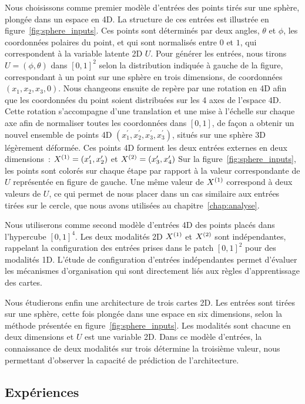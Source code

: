 \documentclass[../main]{subfiles}
\begin{document}
Nous choisissons comme premier modèle d'entrées des points tirés sur une sphère, plongée dans un espace en 4D. 
La structure de ces entrées est illustrée en figure~\ref{fig:sphere_inputs}.
Ces points sont déterminés par deux angles, $\theta$ et $\phi$, les coordonnées polaires du point, et qui sont normalisés entre $0$ et $1$, qui correspondent à la variable latente 2D $U$.
Pour générer les entrées, nous tirons $U = (\phi,\theta)$ dans $[0,1]^2$ selon la distribution indiquée à gauche de la figure, correspondant à un point sur une sphère en trois dimensions, de coordonnées $(x_1,x_2,x_3,0)$. 
Nous changeons ensuite de repère par une rotation en 4D afin que les coordonnées du point soient distribuées sur les 4 axes de l'espace 4D. Cette rotation s'accompagne d'une translation et une mise à l'échelle sur chaque axe afin de normaliser toutes les coordonnées dans $[0,1]$, de façon a obtenir un nouvel ensemble de points 4D $(x_1^\prime,x_2^\prime,x_3^\prime,x_3^\prime)$, situés sur une sphère 3D légèrement déformée.
Ces points 4D forment les deux entrées externes en deux dimensions~: $X^{({1})} = (x_1^\prime, x_2^\prime)$ et $X^{({2})}= (x_3^\prime, x_4^\prime)$
Sur la figure~\ref{fig:sphere_inputs}, les points sont colorés sur chaque étape par rapport à la valeur correspondante de $U$ représentée en figure de gauche.
Une même valeur de $X^{({1})}$ correspond à deux valeurs de $U$, ce qui permet de nous placer dans un cas similaire aux entrées tirées sur le cercle, que nous avons utilisées au chapitre~\ref{chap:analyse}.

Nous utiliserons comme second modèle d'entrées 4D des points placés dans l'hypercube $[0,1]^4$. Les deux modalités 2D $X^{({1})}$ et $X^{({2})}$ sont indépendantes, rappelant la configuration des entrées prises dans le patch $[0,1]^2$ pour des modalités 1D. L'étude de configuration d'entrées indépendantes permet d'évaluer les mécanismes d'organisation qui sont directement liés aux règles d'apprentissage des cartes.

Nous étudierons enfin une architecture de trois cartes 2D. Les entrées sont tirées sur une sphère, cette fois plongée dans une espace en six dimensions, selon la méthode présentée en figure~\ref{fig:sphere_inputs}. Les modalités sont chacune en deux dimensions et $U$ est une variable 2D. Dans ce modèle d'entrées, la connaissance de deux modalités sur trois détermine la troisième valeur, nous permettant d'observer la capacité de prédiction de l'architecture.

\subsection{Expériences}
\end{document}
